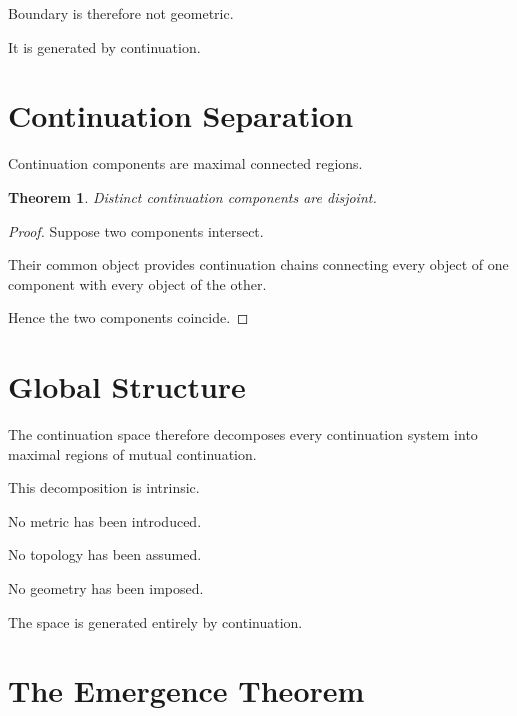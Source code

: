 \documentclass[13pt,openany]{book}
\theoremstyle{plain}
\newtheorem{theorem}{Theorem}[chapter]
\theoremstyle{definition}
\begin{document}
Boundary is therefore not geometric.

It is generated by continuation.


\section{Continuation Separation}

Continuation components are maximal connected regions.

\begin{theorem}

Distinct continuation components are disjoint.

\end{theorem}

\begin{proof}

Suppose two components intersect.

Their common object provides continuation chains connecting every object of one
component with every object of the other.

Hence the two components coincide.

\end{proof}


\section{Global Structure}

The continuation space therefore decomposes every continuation system into
maximal regions of mutual continuation.

This decomposition is intrinsic.

No metric has been introduced.

No topology has been assumed.

No geometry has been imposed.

The space is generated entirely by continuation.


\section{The Emergence Theorem}
\end{document}
